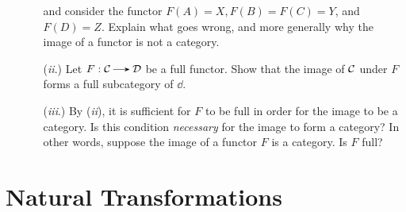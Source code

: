 \begin{itemize}
\begin{itemize}
\begin{center}
                \hspace{1cm}
            \end{center}
            and consider the functor $F(A) = X, F(B) = F(C) = Y$, and $F(D) = Z$. 
            Explain what goes wrong, and more generally why the image of a functor 
            is not a category.

        \item[(\emph{ii}.)]
        Let $F: \cc \to \dd$ be a full functor. 
        Show that the image of $\mathcal{C}$ under $F$ forms a full subcategory of 
        $\dd$.  

        \item[(\emph{iii}.)]
        By (\emph{ii}), it is sufficient for $F$ to be full in order for the image
        to be a category. Is this condition \emph{necessary} for the image to form a category? 
        In other words, suppose the image of a functor $F$ is a category. Is $F$ full?
        \end{itemize}

        
    \end{itemize}

    \newpage
    \section{Natural Transformations}\label{section:natural_transformations}
    
